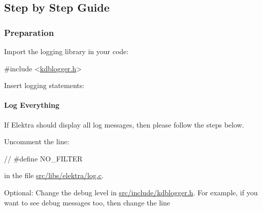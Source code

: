 \subsection*{Step by Step Guide}

\subsubsection*{Preparation}


\begin{DoxyEnumerate}
\item Import the logging library in your code\+:
\end{DoxyEnumerate}


\begin{DoxyCode}
\textcolor{preprocessor}{#include <\hyperlink{kdblogger_8h}{kdblogger.h}>}
\end{DoxyCode}



\begin{DoxyEnumerate}
\item Insert logging statements\+:
\end{DoxyEnumerate}




\paragraph*{Log Everything}

If Elektra should display all log messages, then please follow the steps below.


\begin{DoxyEnumerate}
\item Uncomment the line\+:
\end{DoxyEnumerate}


\begin{DoxyCode}
\textcolor{comment}{// #define NO\_FILTER}
\end{DoxyCode}


in the file {\ttfamily \hyperlink{log_8c}{src/libs/elektra/log.\+c}}.


\begin{DoxyEnumerate}
\item Optional\+: Change the debug level in {\ttfamily \hyperlink{kdblogger_8h}{src/include/kdblogger.\+h}}. For example, if you want to see debug messages too, then change the line
\end{DoxyEnumerate}


